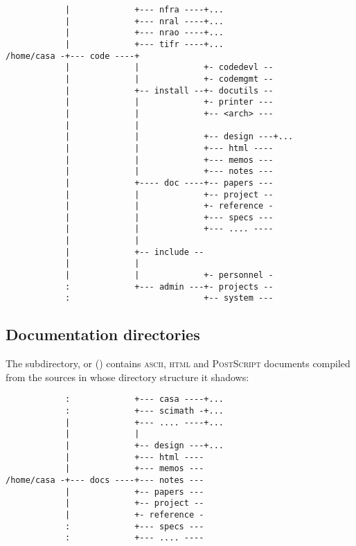 \begin{verbatim}
            |             +--- nfra ----+...
            |             +--- nral ----+...
            |             +--- nrao ----+...
            |             +--- tifr ----+...
/home/casa -+--- code ----+
            |             |             +- codedevl --
            |             |             +- codemgmt --
            |             +-- install --+- docutils --
            |             |             +- printer ---
            |             |             +-- <arch> ---
            |             |
            |             |             +-- design ---+...
            |             |             +--- html ----
            |             |             +--- memos ---
            |             |             +--- notes ---
            |             +---- doc ----+-- papers ---
            |             |             +-- project --
            |             |             +- reference -
            |             |             +--- specs ---
            |             |             +--- .... ----
            |             |
            |             +-- include --
            |             |
            |             |             +- personnel -
            :             +--- admin ---+- projects --
            :                           +-- system ---
\end{verbatim}


\subsection{Documentation directories}
\label{Documentation directories}

The  subdirectory, or  ()
contains \textsc{ascii}, \textsc{html} and \textsc{PostScript} documents
compiled from the sources in  whose directory structure
it shadows:

\begin{verbatim}
            :             +--- casa ----+...
            :             +--- scimath -+...
            |             +--- .... ----+...
            |             |
            |             +-- design ---+...
            |             +--- html ----
            |             +--- memos ---
/home/casa -+--- docs ----+--- notes ---
            |             +-- papers ---
            |             +-- project --
            |             +- reference -
            :             +--- specs ---
            :             +--- .... ----
\end{verbatim}

